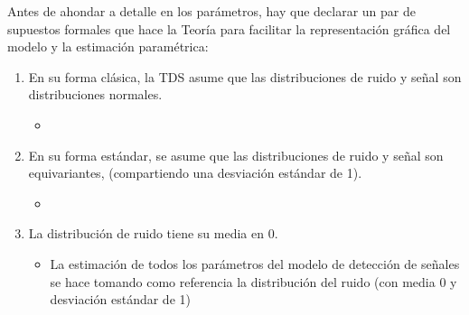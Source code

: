 Antes de ahondar a detalle en los parámetros, hay que declarar un par de supuestos formales que hace la Teoría para facilitar la representación gráfica del modelo y la estimación paramétrica:

\begin{enumerate}
\item En su forma clásica, la TDS asume que las distribuciones de ruido y señal son distribuciones normales.
  \begin{itemize}
  \item 
  \end{itemize}
\item En su forma estándar, se asume que las distribuciones de ruido y señal son equivariantes, (compartiendo una desviación estándar de 1).
  \begin{itemize}
  \item 
  \end{itemize}
\item La distribución de ruido tiene su media en 0. 
  \begin{itemize}
  \item La estimación de todos los parámetros del modelo de detección de señales se hace tomando como referencia la distribución del ruido (con  media 0 y desviación estándar de 1)
  \end{itemize}
\end{enumerate}



